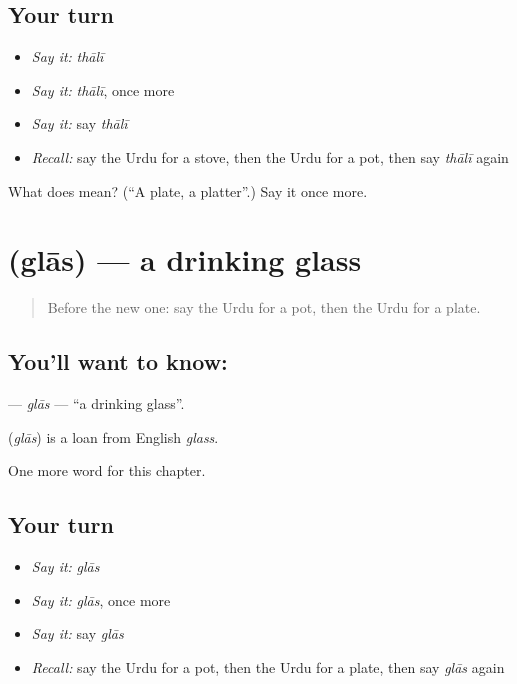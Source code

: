\subsection*{Your turn}
\begin{itemize}
\raggedright
  \item \emph{Say it:} \emph{thālī}
  \item \emph{Say it:} \emph{thālī}, once more
  \item \emph{Say it:} say \emph{thālī}
  \item \emph{Recall:} say the Urdu for a stove, then the Urdu for a pot, then say \emph{thālī} again
\end{itemize}

\begin{tcolorbox}[breakable,colback=teal!4,colframe=teal!35!black,title={Before you move on}]
What does  mean? (\textquotedblleft{}A plate, a platter\textquotedblright{}.) Say it once more.
\end{tcolorbox}
\section[\texorpdfstring{\ur{گلاس} (glās)}{گلاس (glās)}]{ (glās) — a drinking glass}

\label{lesson:UR-C109-glas}



\begin{quote}
Before the new one: say the Urdu for a pot, then the Urdu for a plate.
\end{quote}

\subsection*{You'll want to know: }
\textbf{} — \emph{glās} — \textquotedblleft{}a drinking glass\textquotedblright{}.

\begin{cousinweb}
\textbf{} (\emph{glās}) is a loan from English \emph{glass}.
\end{cousinweb}

\begin{grammarlens}[title={What you've built}]
One more word for this chapter.
\end{grammarlens}

\subsection*{Your turn}
\begin{itemize}
\raggedright
  \item \emph{Say it:} \emph{glās}
  \item \emph{Say it:} \emph{glās}, once more
  \item \emph{Say it:} say \emph{glās}
  \item \emph{Recall:} say the Urdu for a pot, then the Urdu for a plate, then say \emph{glās} again
\end{itemize}

